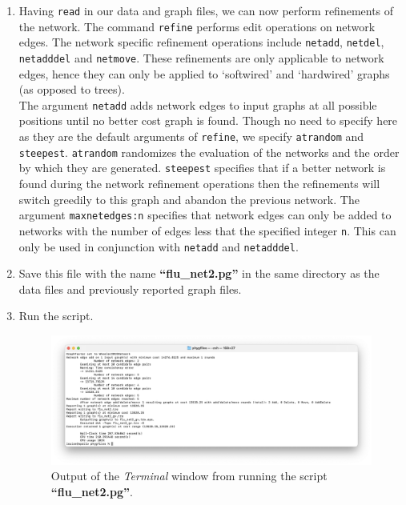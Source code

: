 \documentclass[11pt]{article}
\begin{document}
\begin {enumerate}
\item Having \texttt{read} in our data and graph files, we can now perform refinements 
of the network. The command \texttt{refine} performs edit operations on network 
edges. The network specific refinement operations include \texttt{netadd}, 
\texttt{netdel}, \texttt{netadddel} and \texttt{netmove}. These refinements are 
only applicable to network edges, hence they can only be applied to `softwired' 
and `hardwired' graphs (as opposed to trees). \\

The argument \texttt{netadd} adds network edges to input graphs at all possible
positions until no better cost graph is found. Though no need to specify here as
they are the default arguments of \texttt{refine}, we specify \texttt{atrandom} and 
\texttt{steepest}. \texttt{atrandom} randomizes the evaluation of the networks and 
the order by which they are generated. \texttt{steepest} specifies that if a better 
network is found during the network refinement operations then the refinements 
will switch greedily to this graph and abandon the previous network. The argument  
\texttt{maxnetedges:n} specifies that network edges can only be added to networks 
with the number of edges less that the specified integer \texttt{n}. This can only be 
used in conjunction with \texttt{netadd} and \texttt{netadddel}.

\item Save this file with the name \textbf{``flu\_net2.pg''} in the same directory as the 
data files and previously reported graph files.

\item Run the script.

\begin{figure}
\centering
\includegraphics[width=\textwidth]{output1.png}
\caption{Output of the \textit{Terminal} window from running the script 
\textbf{``flu\_net2.pg''}.}
\label{output1}
\end{figure}


\end{enumerate}
\end{document}
